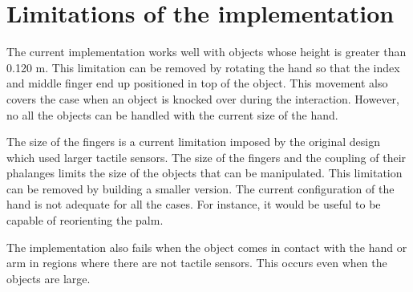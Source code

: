 %
%
%
%
%
%
%
%
%






\section{Limitations of the implementation}
\label{sec:imp:limitations}


 The current implementation works well
with objects whose height is greater than 0.120 m. This limitation
can be removed by rotating the hand so that the index and middle
finger end up positioned in top of the object. This movement also
covers the case when an object is knocked over during the
interaction. However, no all the objects can be handled with the
current size of the hand.

The size of the fingers is a current limitation imposed by the
original design which used larger tactile sensors. The size of the
fingers and the coupling of their phalanges limits the size of the
objects that can be manipulated. This limitation can be removed by
building a smaller version. The current configuration of the hand
is not adequate for all the cases. For instance, it would be
useful to be capable of reorienting the palm.

The implementation also fails when the object comes in contact
with the hand or arm in regions where there are not tactile
sensors. This occurs even when the objects are large.


